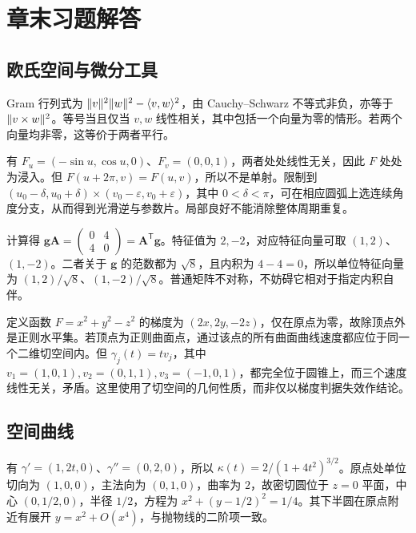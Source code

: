 \setcounter{chapter}{0} %
\chapter{章末习题解答}
\label{app:dg-solutions}

\section{欧氏空间与微分工具}
\begin{solve}
Gram 行列式为 $\lVert v\rVert^2\lVert w\rVert^2-\langle v,w\rangle^2$，由 Cauchy--Schwarz 不等式非负，亦等于 $\lVert v\times w\rVert^2$。等号当且仅当 $v,w$ 线性相关，其中包括一个向量为零的情形。若两个向量均非零，这等价于两者平行。
\end{solve}

\begin{solve}
有 $F_u=(-\sin u,\cos u,0)$、$F_v=(0,0,1)$，两者处处线性无关，因此 $F$ 处处为浸入。但 $F(u+2\pi,v)=F(u,v)$，所以不是单射。限制到 $(u_0-\delta,u_0+\delta)\times(v_0-\varepsilon,v_0+\varepsilon)$，其中 $0<\delta<\pi$，可在相应圆弧上选连续角度分支，从而得到光滑逆与参数片。局部良好不能消除整体周期重复。
\end{solve}

\begin{solve}
计算得 $\mathbf g\mathbf A=\begin{pmatrix}0&4\\4&0\end{pmatrix}=\mathbf A^{\mathsf T}\mathbf g$。特征值为 $2,-2$，对应特征向量可取 $(1,2)$、$(1,-2)$。二者关于 $\mathbf g$ 的范数都为 $\sqrt8$，且内积为 $4-4=0$，所以单位特征向量为 $(1,2)/\sqrt8$、$(1,-2)/\sqrt8$。普通矩阵不对称，不妨碍它相对于指定内积自伴。
\end{solve}

\begin{solve}
定义函数 $F=x^2+y^2-z^2$ 的梯度为 $(2x,2y,-2z)$，仅在原点为零，故除顶点外是正则水平集。若顶点为正则曲面点，通过该点的所有曲面曲线速度都应位于同一个二维切空间内。但 $\gamma_j(t)=tv_j$，其中 $v_1=(1,0,1),v_2=(0,1,1),v_3=(-1,0,1)$，都完全位于圆锥上，而三个速度线性无关，矛盾。这里使用了切空间的几何性质，而非仅以梯度判据失效作结论。
\end{solve}

\section{空间曲线}
\begin{solve}
有 $\gamma'=(1,2t,0)$、$\gamma''=(0,2,0)$，所以 $\kappa(t)=2/(1+4t^2)^{3/2}$。原点处单位切向为 $(1,0,0)$，主法向为 $(0,1,0)$，曲率为 $2$，故密切圆位于 $z=0$ 平面，中心 $(0,1/2,0)$，半径 $1/2$，方程为 $x^2+(y-1/2)^2=1/4$。其下半圆在原点附近有展开 $y=x^2+O(x^4)$，与抛物线的二阶项一致。
\end{solve}

